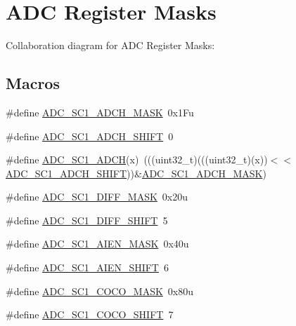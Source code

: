 \hypertarget{group___a_d_c___register___masks}{}\section{A\+DC Register Masks}
\label{group___a_d_c___register___masks}
Collaboration diagram for A\+DC Register Masks\+:
\subsection*{Macros}
\begin{DoxyCompactItemize}
\item 
\#define \hyperlink{group___a_d_c___register___masks_ga7450ced3c2b2df20023c2152f1470640}{A\+D\+C\+\_\+\+S\+C1\+\_\+\+A\+D\+C\+H\+\_\+\+M\+A\+SK}~0x1\+Fu
\item 
\#define \hyperlink{group___a_d_c___register___masks_gab2ba46d5132224f2920c1881e2c1b6fe}{A\+D\+C\+\_\+\+S\+C1\+\_\+\+A\+D\+C\+H\+\_\+\+S\+H\+I\+FT}~0
\item 
\#define \hyperlink{group___a_d_c___register___masks_gab2ec3f01d5b560d3f839439b038f3981}{A\+D\+C\+\_\+\+S\+C1\+\_\+\+A\+D\+CH}(x)~(((uint32\+\_\+t)(((uint32\+\_\+t)(x))$<$$<$\hyperlink{group___a_d_c___register___masks_gab2ba46d5132224f2920c1881e2c1b6fe}{A\+D\+C\+\_\+\+S\+C1\+\_\+\+A\+D\+C\+H\+\_\+\+S\+H\+I\+FT}))\&\hyperlink{group___a_d_c___register___masks_ga7450ced3c2b2df20023c2152f1470640}{A\+D\+C\+\_\+\+S\+C1\+\_\+\+A\+D\+C\+H\+\_\+\+M\+A\+SK})
\item 
\#define \hyperlink{group___a_d_c___register___masks_gadc514fb491cf08eb3fb0f27298388645}{A\+D\+C\+\_\+\+S\+C1\+\_\+\+D\+I\+F\+F\+\_\+\+M\+A\+SK}~0x20u
\item 
\#define \hyperlink{group___a_d_c___register___masks_ga1385c936a9440856068dcb917ed9c658}{A\+D\+C\+\_\+\+S\+C1\+\_\+\+D\+I\+F\+F\+\_\+\+S\+H\+I\+FT}~5
\item 
\#define \hyperlink{group___a_d_c___register___masks_gaa698d898e077003de10a42184de8f124}{A\+D\+C\+\_\+\+S\+C1\+\_\+\+A\+I\+E\+N\+\_\+\+M\+A\+SK}~0x40u
\item 
\#define \hyperlink{group___a_d_c___register___masks_gaf2cde8fb207dd348e6313d6d0a5b3761}{A\+D\+C\+\_\+\+S\+C1\+\_\+\+A\+I\+E\+N\+\_\+\+S\+H\+I\+FT}~6
\item 
\#define \hyperlink{group___a_d_c___register___masks_ga698a3a178a5b412febc8c0cc849e8896}{A\+D\+C\+\_\+\+S\+C1\+\_\+\+C\+O\+C\+O\+\_\+\+M\+A\+SK}~0x80u
\item 
\#define \hyperlink{group___a_d_c___register___masks_gad708b138ec734a371a20a990f0c9a27f}{A\+D\+C\+\_\+\+S\+C1\+\_\+\+C\+O\+C\+O\+\_\+\+S\+H\+I\+FT}~7
$$
\end{DoxyCompactItemize}
